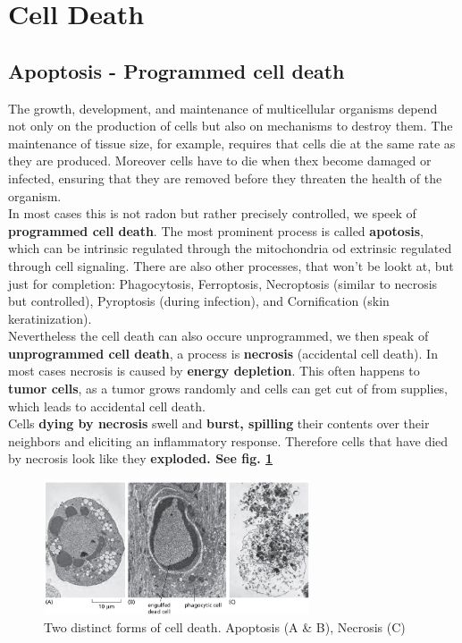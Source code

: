 \documentclass[../main.tex]{subfiles}
\begin{document}
	
\section{Cell Death}



\subsection{Apoptosis - Programmed cell death}
The growth, development, and maintenance of multicellular organisms depend not only on the production of cells but also on mechanisms to destroy them. The maintenance of tissue size, for example, requires that cells die at the same rate as they are produced. Moreover cells have to die when thex become damaged or infected, ensuring that they are removed before they threaten the health of the organism.\\
\indent In most cases this is not radon but rather precisely controlled, we speek of \textbf{programmed cell death}. The most prominent process is called \textbf{apotosis}, which can be intrinsic regulated through the mitochondria od extrinsic regulated through cell signaling. There are also other processes, that won't be lookt at, but just for completion: Phagocytosis, Ferroptosis, Necroptosis (similar to necrosis but controlled), Pyroptosis (during infection), and Cornification (skin keratinization). \\
\indent Nevertheless the cell death can also occure unprogrammed, we then speak of \textbf{unprogrammed cell death}, a process is \textbf{\gls{necrosis}} (accidental cell death). In most cases necrosis is caused by \textbf{energy depletion}. This often happens to \textbf{tumor cells}, as a tumor grows randomly and cells can get cut of from supplies, which leads to accidental cell death. \\
\indent Cells \textbf{dying by necrosis} swell and \textbf{burst, spilling} their contents over their neighbors and eliciting an inflammatory response. Therefore cells that have died by necrosis look like they \textbf{exploded. See fig. \ref{necrosis}}

\begin{figure}[H]
	\centering
	\includegraphics[width = 0.7\textwidth]{1}
	\caption{Two distinct forms of cell death. Apoptosis (A \& B), Necrosis (C)}
	\label{necrosis}
\end{figure}
\end{document}
